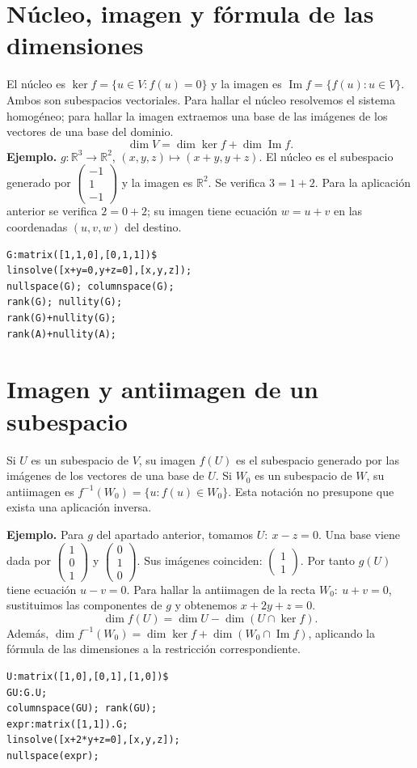 \documentclass[12pt,a4paper]{article}
\begin{document}
\section{Núcleo, imagen y fórmula de las dimensiones}
El núcleo es $\ker f=\{u\in V:f(u)=0\}$ y la imagen es $\operatorname{Im} f=\{f(u):u\in V\}$. Ambos son subespacios vectoriales. Para hallar el núcleo resolvemos el sistema homogéneo; para hallar la imagen extraemos una base de las imágenes de los vectores de una base del dominio.
\[\boxed{\dim V=\dim\ker f+\dim\operatorname{Im} f.}\]
\textbf{Ejemplo.} $g:\mathbb R^3\to\mathbb R^2$, $(x,y,z)\mapsto(x+y,y+z)$. El núcleo es el subespacio generado por $\begin{pmatrix}-1\\1\\-1\end{pmatrix}$ y la imagen es $\mathbb R^2$. Se verifica $3=1+2$. Para la aplicación anterior se verifica $2=0+2$; su imagen tiene ecuación $w=u+v$ en las coordenadas $(u,v,w)$ del destino.
\begin{lstlisting}
G:matrix([1,1,0],[0,1,1])$
linsolve([x+y=0,y+z=0],[x,y,z]);
nullspace(G); columnspace(G);
rank(G); nullity(G);
rank(G)+nullity(G);
rank(A)+nullity(A);
\end{lstlisting}
\section{Imagen y antiimagen de un subespacio}
Si $U$ es un subespacio de $V$, su imagen $f(U)$ es el subespacio generado por las imágenes de los vectores de una base de $U$. Si $W_0$ es un subespacio de $W$, su antiimagen es $f^{-1}(W_0)=\{u:f(u)\in W_0\}$. Esta notación no presupone que exista una aplicación inversa.

\textbf{Ejemplo.} Para $g$ del apartado anterior, tomamos $U:\ x-z=0$. Una base viene dada por $\begin{pmatrix}1\\0\\1\end{pmatrix}$ y $\begin{pmatrix}0\\1\\0\end{pmatrix}$. Sus imágenes coinciden: $\begin{pmatrix}1\\1\end{pmatrix}$. Por tanto $g(U)$ tiene ecuación $u-v=0$. Para hallar la antiimagen de la recta $W_0:\ u+v=0$, sustituimos las componentes de $g$ y obtenemos $x+2y+z=0$.
\[\dim f(U)=\dim U-\dim(U\cap\ker f).\]
Además, $\dim f^{-1}(W_0)=\dim\ker f+\dim(W_0\cap\operatorname{Im}f)$, aplicando la fórmula de las dimensiones a la restricción correspondiente.
\begin{lstlisting}
U:matrix([1,0],[0,1],[1,0])$
GU:G.U;
columnspace(GU); rank(GU);
expr:matrix([1,1]).G;
linsolve([x+2*y+z=0],[x,y,z]);
nullspace(expr);
\end{lstlisting}
\end{document}
